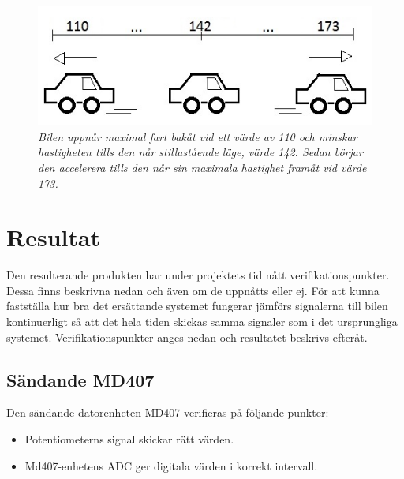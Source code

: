 \documentclass[a4paper]{article}
\begin{document}
\begin{figure}[H]
\includegraphics[scale=1]{110-173Car.jpg}
\centering
\caption{\it Bilen uppnår maximal fart bakåt vid ett värde av 110 och minskar hastigheten tills den når stillastående läge, värde 142. Sedan börjar den accelerera tills den når sin maximala hastighet framåt vid värde 173.}
\end{figure} 









\newpage
\section{Resultat}
Den resulterande produkten har under projektets tid nått verifikationspunkter. Dessa finns beskrivna nedan och även om de uppnåtts eller ej. För att kunna fastställa hur bra det ersättande systemet fungerar jämförs signalerna till bilen kontinuerligt så att det hela tiden skickas samma signaler som i det ursprungliga systemet. Verifikationspunkter anges nedan och resultatet beskrivs efteråt.

\subsection{Sändande MD407}
Den sändande datorenheten MD407 verifieras på följande punkter:
\begin{itemize}
\item Potentiometerns signal skickar rätt värden.
\item Md407-enhetens ADC ger digitala värden i korrekt intervall.
\end{itemize}
\end{document}
